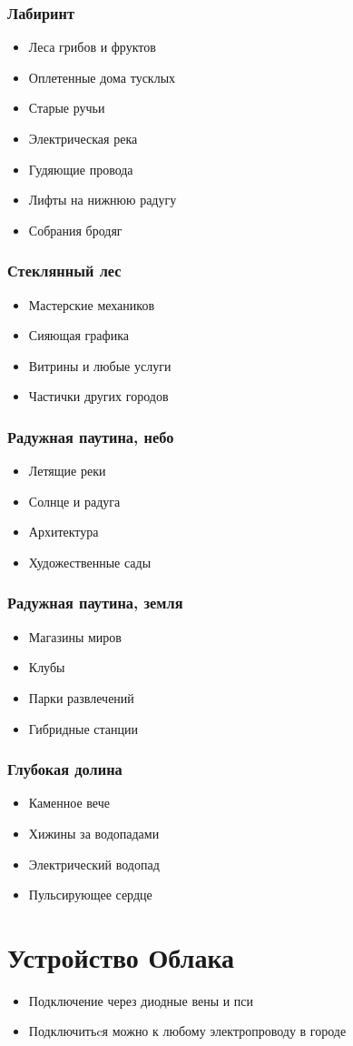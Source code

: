 \section{Лабиринт}
\begin{itemize}
	\item Леса грибов и фруктов
	\item Оплетенные дома тусклых
	\item Старые ручьи
	\item Электрическая река
	\item Гудяющие провода
	\item Лифты на нижнюю радугу
	\item Собрания бродяг
\end{itemize}
\section{Стеклянный лес}
\begin{itemize}
	\item Мастерские механиков
	\item Сияющая графика
	\item Витрины и любые услуги
	\item Частички других городов
\end{itemize}
\section{Радужная паутина, небо}
\begin{itemize}
	\item Летящие реки
	\item Солнце и радуга
	\item Архитектура
	\item Художественные сады
\end{itemize}
\section{Радужная паутина, земля}
\begin{itemize}
	\item Магазины миров
	\item Клубы
	\item Парки развлечений
	\item Гибридные станции
\end{itemize}
\section{Глубокая долина}
\begin{itemize}
	\item Каменное вече
	\item Хижины за водопадами
	\item Электрический водопад
	\item Пульсирующее сердце
\end{itemize}



\clearpage
\part{Устройство Облака}
\begin{itemize}
	\item Подключение через диодные вены и пси
	\item Подключитьcя можно к любому электропроводу в городе
\end{itemize}



